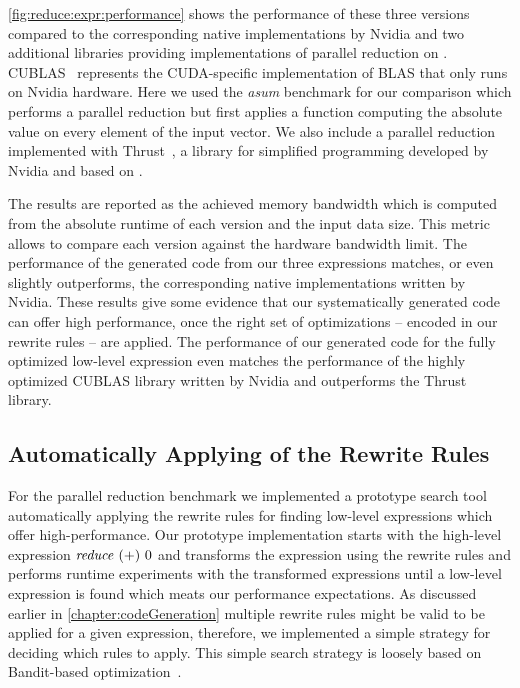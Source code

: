 \autoref{fig:reduce:expr:performance} shows the performance of these three versions compared to the corresponding native \OpenCL implementations by Nvidia and two additional libraries providing implementations of parallel reduction on \GPUs.
CUBLAS~\cite{cuBLAS} represents the CUDA-specific implementation of BLAS that only runs on Nvidia hardware.
Here we used the \emph{asum} benchmark for our comparison which performs a parallel reduction but first applies a function computing the absolute value on every element of the input vector.
We also include a parallel reduction implemented with Thrust~\cite{BellHo2011}, a library for simplified \GPU programming developed by Nvidia and based on \CUDA.

The results are reported as the achieved memory bandwidth which is computed from the absolute runtime of each version and the input data size.
This metric allows to compare each version against the hardware bandwidth limit.
The performance of the generated \OpenCL code from our three expressions matches, or even slightly outperforms, the corresponding native \OpenCL implementations written by Nvidia.
These results give some evidence that our systematically generated code can offer high performance, once the right set of optimizations -- encoded in our rewrite rules -- are applied.
The performance of our generated code for the fully optimized low-level expression even matches the performance of the highly optimized CUBLAS library written by Nvidia and outperforms the Thrust library.

\subsection{Automatically Applying of the Rewrite Rules}
\label{sec:codeGeneration-evaluation:automatic}

For the parallel reduction benchmark we implemented a prototype search tool automatically applying the rewrite rules for finding low-level expressions which offer high-performance.
Our prototype implementation starts with the high-level expression $\text{\textit{reduce}}\ (+)\ 0$ and transforms the expression using the rewrite rules and performs runtime experiments with the transformed expressions until a low-level \OpenCL expression is found which meats our performance expectations.
As discussed earlier in \autoref{chapter:codeGeneration} multiple rewrite rules might be valid to be applied for a given expression, therefore, we implemented a simple strategy for deciding which rules to apply.
This simple search strategy is loosely based on Bandit-based optimization~\cite{MesmayRVP09}.

